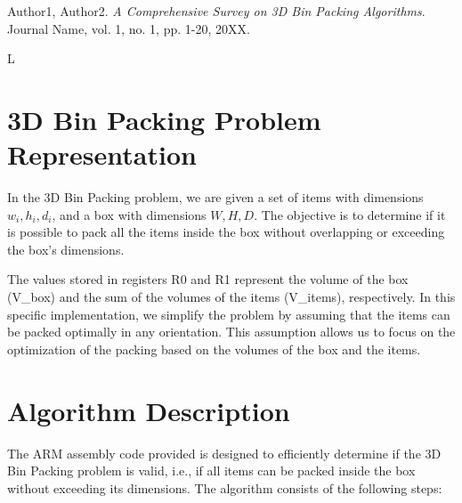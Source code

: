 \begin{thebibliography}{9}

Author1, Author2.
\textit{A Comprehensive Survey on 3D Bin Packing Algorithms}.
Journal Name, vol. 1, no. 1, pp. 1-20, 20XX.

L

\section{3D Bin Packing Problem Representation}

In the 3D Bin Packing problem, we are given a set of items with dimensions $w_i, h_i, d_i$, and a box with dimensions $W, H, D$. The objective is to determine if it is possible to pack all the items inside the box without overlapping or exceeding the box's dimensions.

The values stored in registers R0 and R1 represent the volume of the box (V\_box) and the sum of the volumes of the items (V\_items), respectively. In this specific implementation, we simplify the problem by assuming that the items can be packed optimally in any orientation. This assumption allows us to focus on the optimization of the packing based on the volumes of the box and the items.

\section{Algorithm Description}

The ARM assembly code provided is designed to efficiently determine if the 3D Bin Packing problem is valid, i.e., if all items can be packed inside the box without exceeding its dimensions. The algorithm consists of the following steps:


\end{thebibliography}
